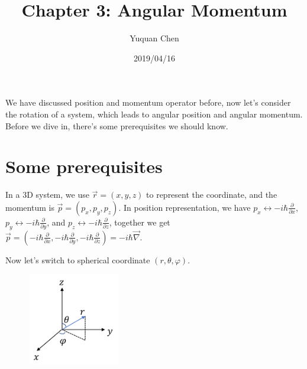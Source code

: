 \documentclass[UTF8,12pt]{article} %
\numberwithin{equation}{section}
\begin{document}
\title{Chapter 3: Angular Momentum}
\author{Yuquan Chen}
\date{2019/04/16} %
\maketitle

We have discussed position and momentum operator before, now let's consider the rotation of a system, which leads to angular position and angular momentum. Before we dive in, there's some prerequisites we should know.

\section{Some prerequisites}

In a 3D system, we use $\vec{r} = (x,y,z)$ to represent the coordinate, and the momentum is $\vec{p} = (p_{x}, p_{y}, p_{z})$. In position representation, we have $p_{x} \leftrightarrow -i\hbar \frac{\partial}{\partial x}$, $p_{y} \leftrightarrow -i\hbar \frac{\partial}{\partial y}$, and $p_{z} \leftrightarrow -i\hbar \frac{\partial}{\partial z}$, together we get $\vec{p} = (-i\hbar \frac{\partial}{\partial x}, -i\hbar \frac{\partial}{\partial y}, -i\hbar \frac{\partial}{\partial z}) = -i\hbar \vec{\nabla}$.

Now let's switch to spherical coordinate $(r, \theta, \varphi)$.
\begin{figure}[H]
\begin{center}
\includegraphics[width=4cm]{sph}
\end{center}
\end{figure}
\end{document}
